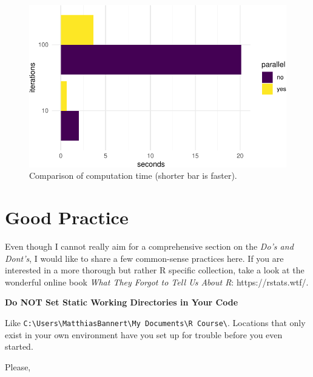 \documentclass[
  12pt,
  letterpaper,
]{krantz}
\begin{document}
\begin{figure}[H]

{\centering \includegraphics{./case-studies_files/figure-pdf/fig-benchmark-1.pdf}

}

\caption{\label{fig-benchmark}Comparison of computation time (shorter
bar is faster).}

\end{figure}

\hypertarget{good-practice}{%
\section{\texorpdfstring{Good
Practice}{Good Practice}}\label{good-practice}}

Even though I cannot really aim for a comprehensive section on the
\emph{Do's and Dont's}, I would like to share a few common-sense
practices here. If you are interested in a more thorough but rather R
specific collection, take a look at the wonderful online book \emph{What
They Forgot to Tell Us About R}: https://rstats.wtf/.

\textbf{Do NOT Set Static Working Directories in Your Code}

Like
\texttt{C:\textbackslash{}Users\textbackslash{}MatthiasBannert\textbackslash{}My\ Documents\textbackslash{}R\ Course\textbackslash{}}.
Locations that only exist in your own environment have you set up for
trouble before you even started.

Please,
\end{document}
